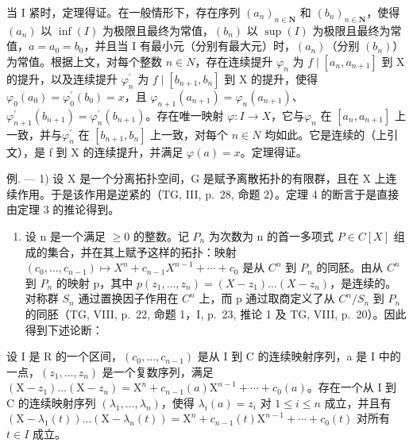当 I 紧时，定理得证。在一般情形下，存在序列 \((a_{n})_{n\in\mathbf{N}}\) 和 \((b_{n})_{n\in\mathbf{N}}\)，使得 \((a_{n})\) 以 \(\inf(I)\) 为极限且最终为常值，\((b_{n})\) 以 \(\sup(I)\) 为极限且最终为常值，\(a=a_{0}=b_{0}\)，并且当 I 有最小元（分别有最大元）时，\((a_{n})\)（分别 \((b_{n})\)）为常值。根据上文，对每个整数 \(n\in N\)，存在连续提升 \(\varphi_{n}\) 为 \(f\mid[a_{n},a_{n+1}]\) 到 X 的提升，以及连续提升 \(\varphi_{n}^{\prime}\) 为 \(f\mid[b_{n+1},b_n]\) 到 X 的提升，使得 \(\varphi_{0}(a_{0})=\varphi_{0}^{\prime}(b_{0})=x\)，且 \(\varphi_{n+1}(a_{n+1})=\varphi_{n}(a_{n+1})\)、\(\varphi_{n+1}^{\prime}(b_{n+1})=\varphi_{n}^{\prime}(b_{n+1})\)。存在唯一映射 \(\varphi\colon I\to X\)，它与\(\varphi_{n}\) 在 \([a_{n},a_{n+1}]\) 上一致，并与\(\varphi_{n}^{\prime}\) 在 \([b_{n+1},b_{n}]\) 上一致，对每个 \(n\in N\) 均如此。它是连续的（上引文），是 f 到 X 的连续提升，并满足 \(\varphi(a)=x\)。定理得证。

例. --- 1) 设 X 是一个分离拓扑空间，G 是赋予离散拓扑的有限群，且在 X 上连续作用。于是该作用是逆紧的（TG, III, p.~28, 命题 2）。定理 4 的断言于是直接由定理 3 的推论得到。

\begin{enumerate}
\def\labelenumi{\arabic{enumi})}
\setcounter{enumi}{1}
\tightlist
\item
 设 n 是一个满足 \(\geqslant 0\) 的整数。记 \(P_{n}\) 为次数为 n 的首一多项式 \(P \in C[X]\) 组成的集合，并在其上赋予这样的拓扑：映射 \((c_{0}, \ldots, c_{n-1}) \mapsto X^{n} + c_{n-1}X^{n-1} + \cdots + c_{0}\) 是从 \(C^{n}\) 到 \(P_{n}\) 的同胚。由从 \(C^{n}\) 到 \(P_{n}\) 的映射 p，其中 \(p(z_{1}, \ldots, z_{n}) = (X - z_{1}) \ldots (X - z_{n})\)，是连续的。对称群 \(S_{n}\) 通过置换因子作用在 \(C^{n}\) 上，而 p 通过取商定义了从 \(C^{n}/S_{n}\) 到 \(P_{n}\) 的同胚（TG, VIII, p.~22, 命题 1，I, p.~23, 推论 1 及 TG, VIII, p.~20）。因此得到下述论断：
\end{enumerate}

设 I 是 R 的一个区间，\((c_{0},\ldots,c_{n-1})\) 是从 I 到 C 的连续映射序列，a 是 I 中的一点，\((z_{1},\ldots,z_{n})\) 是一个复数序列，满足 \((\mathrm{X}-z_{1})\ldots(\mathrm{X}-z_{n})=\mathrm{X}^{n}+c_{n-1}(a)\mathrm{X}^{n-1}+\cdots+c_{0}(a)\)。存在一个从 I 到 C 的连续映射序列 \((\lambda_{1},\ldots,\lambda_{n})\)，使得 \(\lambda_{i}(a)=z_{i}\) 对 \(1\leqslant i\leqslant n\) 成立，并且有 \((\mathrm{X}-\lambda_{1}(t))\ldots(\mathrm{X}-\lambda_{n}(t))=\mathrm{X}^{n}+c_{n-1}(t)\mathrm{X}^{n-1}+\cdots+c_{0}(t)\) 对所有 \(t\in I\) 成立。

